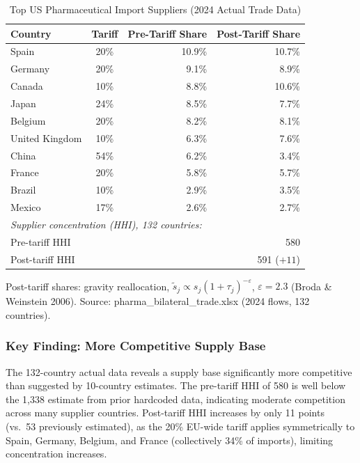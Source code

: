\documentclass[12pt]{article}
\begin{document}
\begin{table}[H]
\centering
\caption{Top US Pharmaceutical Import Suppliers (2024 Actual Trade Data)}
\label{tab:pharma_suppliers}
\begin{tabular}{lcrr}
\toprule
Country & Tariff & Pre-Tariff Share & Post-Tariff Share \\
\midrule
Spain          & 20\% & 10.9\% & 10.7\% \\
Germany        & 20\% &  9.1\% &  8.9\% \\
Canada         & 10\% &  8.8\% & 10.6\% \\
Japan          & 24\% &  8.5\% &  7.7\% \\
Belgium        & 20\% &  8.2\% &  8.1\% \\
United Kingdom & 10\% &  6.3\% &  7.6\% \\
China          & 54\% &  6.2\% &  3.4\% \\
France         & 20\% &  5.8\% &  5.7\% \\
Brazil         & 10\% &  2.9\% &  3.5\% \\
Mexico         & 17\% &  2.6\% &  2.7\% \\
\midrule
\multicolumn{4}{l}{\textit{Supplier concentration (HHI), 132 countries:}} \\
Pre-tariff HHI & \multicolumn{3}{r}{580} \\
Post-tariff HHI & \multicolumn{3}{r}{591 ($+11$)} \\
\bottomrule
\end{tabular}
\begin{tablenotes}
\small
\item Post-tariff shares: gravity reallocation, $\tilde{s}_j \propto
s_j(1+\tau_j)^{-\varepsilon}$, $\varepsilon = 2.3$ (Broda \& Weinstein 2006).
Source: pharma\_bilateral\_trade.xlsx (2024 flows, 132 countries).
\end{tablenotes}
\end{table}

\subsubsection{Key Finding: More Competitive Supply Base}

The 132-country actual data reveals a supply base significantly more competitive
than suggested by 10-country estimates. The pre-tariff HHI of 580 is
well below the 1,338 estimate from prior hardcoded data, indicating moderate
competition across many supplier countries. Post-tariff HHI increases by only
11 points (vs.\ 53 previously estimated), as the 20\% EU-wide tariff applies
symmetrically to Spain, Germany, Belgium, and France (collectively 34\% of
imports), limiting concentration increases.
\end{document}
